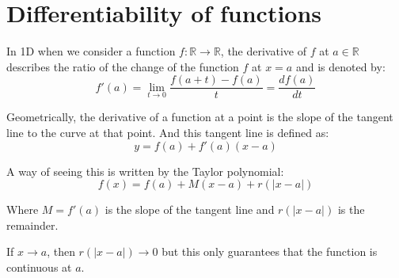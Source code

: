 \documentclass[11pt]{article}
\begin{document}
\section{Differentiability of functions}
In 1D when we consider a function $f : \mathbb{R} \rightarrow \mathbb{R}$, the derivative of $f$ at $a \in \mathbb{R}$ describes the ratio of the change of the function $f$ at $x = a$ and is denoted by:
\[
f'(a) = \lim_{t \to 0} \frac{f(a + t) - f(a)}{t} = \frac{df(a)}{dt}
\]

Geometrically, the derivative of a function at a point is the slope of the tangent line to the curve at that point. And this tangent line is defined as:
\[
y = f(a) + f'(a)(x - a)
\]

\begin{center}
\end{center}

A way of seeing this is written by the Taylor polynomial:
\[
f(x) = f(a) + M(x - a) + r(|x - a|)
\]

Where $M = f'(a)$ is the slope of the tangent line and $r(|x - a|)$ is the remainder.

If $x \to a$, then $r(|x - a|) \to 0$ but this only guarantees that the function is continuous at $a$.
\end{document}
